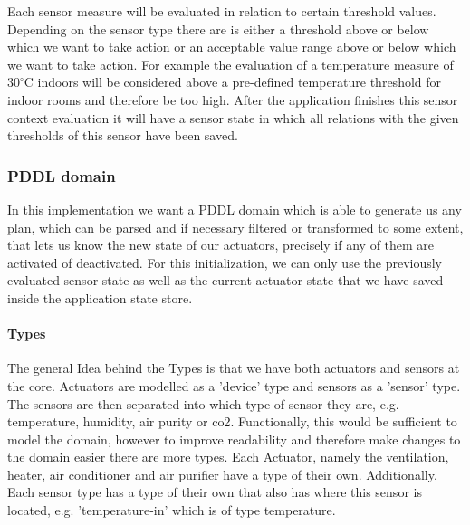 \documentclass[runningheads]{llncs}
\begin{document}
    Each sensor measure will be evaluated in relation to certain threshold values. Depending on the sensor type there are is either a threshold above or below which we want to take action or an acceptable value range above or below which we want to take action. For example the evaluation of a temperature measure of $30^\circ$C indoors will be considered above a pre-defined temperature threshold for indoor rooms and therefore be too high. After the application finishes this sensor context evaluation it will have a sensor state in which all relations with the given thresholds of this sensor have been saved. 

    \subsubsection{PDDL domain}
    In this implementation we want a PDDL domain which is able to generate us any plan, which can be parsed and if necessary filtered or transformed to some extent, that lets us know the new state of our actuators, precisely if any of them are activated of deactivated. For this initialization, we can only use the previously evaluated sensor state as well as the current actuator state that we have saved inside the application state store. 

    \paragraph{Types}
    The general Idea behind the Types is that we have both actuators and sensors at the core. Actuators are modelled as a 'device' type and sensors as a 'sensor' type. The sensors are then separated into which type of sensor they are, e.g. temperature, humidity, air purity or co2. Functionally, this would be sufficient to model the domain, however to improve readability and therefore make changes to the domain easier there are more types. Each Actuator, namely the ventilation, heater, air conditioner and air purifier have a type of their own. Additionally, Each sensor type has a type of their own that also has where this sensor is located, e.g. 'temperature-in' which is of type temperature.
\end{document}
